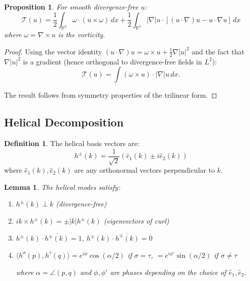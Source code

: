 \documentclass[11pt]{article}
\newtheorem{lemma}[theorem]{Lemma}
\newtheorem{proposition}[theorem]{Proposition}
\theoremstyle{definition}
\newtheorem{definition}[theorem]{Definition}
\newcommand{\R}{\mathbb{R}}
\begin{document}
\begin{proposition}\label{prop:trilinear-identity}
For smooth divergence-free $u$:
\begin{equation}
\mathcal{T}(u) = \frac{1}{2} \int_{\R^3} \omega \cdot (u \times \omega) \, dx + \frac{1}{2}\int_{\R^3} |\nabla| u \cdot [(u \cdot \nabla)u - u \cdot \nabla u] \, dx
\end{equation}
where $\omega = \nabla \times u$ is the vorticity.
\end{proposition}

\begin{proof}
Using the vector identity $(u \cdot \nabla)u = \omega \times u + \frac{1}{2}\nabla|u|^2$ and the fact that $\nabla|u|^2$ is a gradient (hence orthogonal to divergence-free fields in $L^2$):
\begin{equation}
\mathcal{T}(u) = \int (\omega \times u) \cdot |\nabla| u \, dx.
\end{equation}

The result follows from symmetry properties of the trilinear form.
\end{proof}

\subsection{Helical Decomposition}

\begin{definition}
The helical basis vectors are:
\begin{equation}
h^\pm(k) = \frac{1}{\sqrt{2}}(\hat{e}_1(k) \pm i \hat{e}_2(k))
\end{equation}
where $\hat{e}_1(k), \hat{e}_2(k)$ are any orthonormal vectors perpendicular to $k$.
\end{definition}

\begin{lemma}\label{lem:helical-props}
The helical modes satisfy:
\begin{enumerate}
\item $h^\pm(k) \perp k$ (divergence-free)
\item $ik \times h^\pm(k) = \pm |k| h^\pm(k)$ (eigenvectors of curl)
\item $h^\pm(k) \cdot \overline{h^\pm(k)} = 1$, $h^\pm(k) \cdot \overline{h^\mp(k)} = 0$
\item $\langle h^\sigma(p), h^\tau(q) \rangle = e^{i\phi} \cos(\alpha/2)$ if $\sigma = \tau$, $= e^{i\phi'} \sin(\alpha/2)$ if $\sigma \neq \tau$

where $\alpha = \angle(p, q)$ and $\phi, \phi'$ are phases depending on the choice of $\hat{e}_1, \hat{e}_2$.
\end{enumerate}
\end{lemma}
\end{document}
